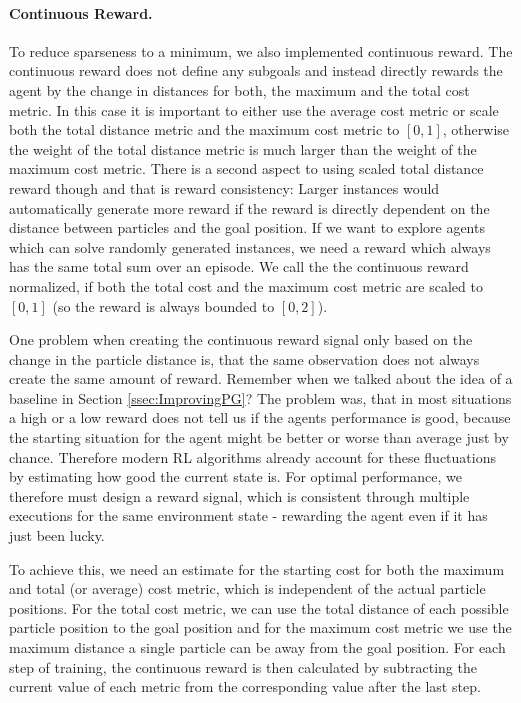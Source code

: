 \paragraph{Continuous Reward.}
To reduce sparseness to a minimum, we also implemented continuous reward. The continuous reward does not define any subgoals and instead directly rewards the agent by the change in distances for both, the maximum and the total cost metric. In this case it is important to either use the average cost metric or scale both the total distance metric and the maximum cost metric to $[0, 1]$, otherwise the weight of the total distance metric is much larger than the weight of the maximum cost metric. There is a second aspect to using scaled total distance reward though and that is reward consistency: Larger instances would automatically generate more reward if the reward is directly dependent on the distance between particles and the goal position. If we want to explore agents which can solve randomly generated instances, we need a reward which always has the same total sum over an episode. We call the the continuous reward normalized, if both the total cost and the maximum cost metric are scaled to $[0, 1]$ (so the reward is always bounded to $[0, 2]$). 

One problem when creating the continuous reward signal only based on the change in the particle distance is, that the same observation does not always create the same amount of reward. Remember when we talked about the idea of a baseline in Section \ref{ssec:ImprovingPG}? The problem was, that in most situations a high or a low reward does not tell us if the agents performance is good, because the starting situation for the agent might be better or worse than average just by chance. Therefore modern RL algorithms already account for these fluctuations by estimating how good the current state is. For optimal performance, we therefore must design a reward signal, which is consistent through multiple executions for the same environment state - rewarding the agent even if it has just been lucky.

To achieve this, we need an estimate for the starting cost for both the maximum and total (or average) cost metric, which is independent of the actual particle positions. For the total cost metric, we can use the total distance of each possible particle position to the goal position and for the maximum cost metric we use the maximum distance a single particle can be away from the goal position. For each step of training, the continuous reward is then calculated by subtracting the current value of each metric from the corresponding value after the last step. 

